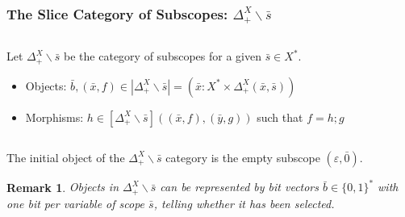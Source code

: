 \documentclass[aspectratio=169]{beamer}
\theoremstyle{remarkstyle}
\newtheorem*{remark}{Remark}
\begin{document}
\begin{frame}[fragile]
  \frametitle{The Slice Category of Subscopes: $Δ_+^X∖\bar{s}$}
  \begin{definition}
    \begin{columns}
      \begin{column}{0.68\textwidth}
        Let $Δ_+^X∖\bar{s}$ be the category of subscopes for a given $\bar{s} ∈ X^*$. 
        \begin{itemize}
          \item Objects: $\bar{b}, (\bar{x}, f) ∈ |Δ_+^X∖\bar{s}| = \left(\bar{x} : X^* × Δ_+^X(\bar{x}, \bar{s}) \right)$
          \item Morphisms: $h ∈ [Δ_+^X∖\bar{s}]((\bar{x}, f), (\bar{y}, g))$ such that $f = h;g$ 
        \end{itemize}
      \end{column}
      \begin{column}{0.3\textwidth}
      \end{column}
    \end{columns}
    
  \end{definition}
  \begin{corollary}
    The initial object of the $Δ_+^X∖\bar{s}$ category is the empty subscope $(ε, \bar{0})$. 
  \end{corollary}
  \begin{remark}
    Objects in $Δ_+^X∖\bar{s}$ can be represented by \emph{bit vectors} $\bar{b} ∈ \{0, 1\}^*$ with one bit per variable of scope $\bar{s}$, telling whether it has been selected.
  \end{remark}
\end{frame}
\end{document}
